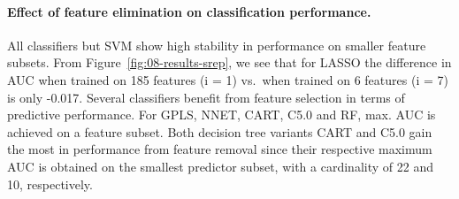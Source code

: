 \documentclass[
  oneside]{book}
\begin{document}
\paragraph*{Effect of feature elimination on classification performance.}

All classifiers but SVM show high stability in performance on smaller feature subsets.
From Figure~\ref{fig:08-results-srep}, we see that for LASSO the difference in AUC when trained on 185 features (i = 1) vs.~when trained on 6 features (i = 7) is only -0.017.
Several classifiers benefit from feature selection in terms of predictive performance.
For GPLS, NNET, CART, C5.0 and RF, max. AUC is achieved on a feature subset.
Both decision tree variants CART and C5.0 gain the most in performance from feature removal since their respective maximum AUC is obtained on the smallest predictor subset, with a cardinality of 22 and 10, respectively.
\end{document}
